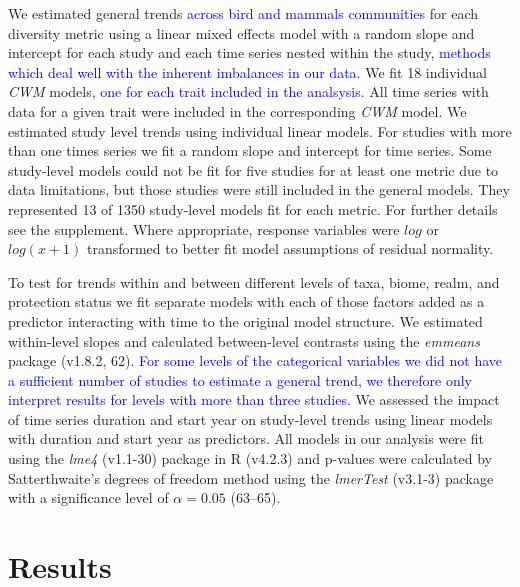 \documentclass{article}
\begin{document}
We estimated general trends
\textcolor{blue}{across bird and mammals communities} for each diversity
metric using a linear mixed effects model with a random slope and
intercept for each study and each time series nested within the study,
\textcolor{blue}{methods which deal well with the inherent imbalances in our data.}
We fit 18 individual \emph{CWM} models,
\textcolor{blue}{one for each trait included in the analsysis}. All time
series with data for a given trait were included in the corresponding
\emph{CWM} model. We estimated study level trends using individual
linear models. For studies with more than one times series we fit a
random slope and intercept for time series. Some study-level models
could not be fit for five studies for at least one metric due to data
limitations, but those studies were still included in the general
models. They represented 13 of 1350 study-level models fit for each
metric. For further details see the supplement. Where appropriate,
response variables were \(log\) or \(log(x+1)\) transformed to better
fit model assumptions of residual normality.

To test for trends within and between different levels of taxa, biome,
realm, and protection status we fit separate models with each of those
factors added as a predictor interacting with time to the original model
structure. We estimated within-level slopes and calculated between-level
contrasts using the \emph{emmeans} package (v1.8.2, 62).
\textcolor{blue}{For some levels of the categorical variables we did not have a sufficient number of studies to estimate a general trend, we therefore only interpret results for levels with more than three studies.}
We assessed the impact of time series duration and start year on
study-level trends using linear models with duration and start year as
predictors. All models in our analysis were fit using the \emph{lme4}
(v1.1-30) package in R (v4.2.3) and p-values were calculated by
Satterthwaite's degrees of freedom method using the \emph{lmerTest}
(v3.1-3) package with a significance level of \(\alpha = 0.05\)
(63--65).

\hypertarget{results}{%
\section{Results}\label{results}}
\end{document}

